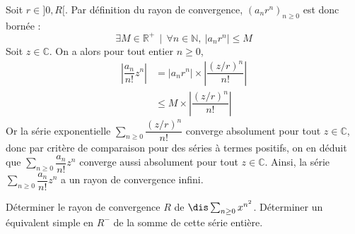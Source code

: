 \documentclass[a4paper,10pt]{report}
\newcommand{\Sum}[2]{\ensuremath{\textstyle{\sum\limits_{#1}^{#2}}}}
\begin{document}
\corr Soit $r\in ]0,R[$. Par définition du rayon de convergence, $(a_n r^n)_{n \geq 0}$ est donc bornée : 
\[
\exists M\in\mathbb{R}^+\,\mid\, \forall n\in\mathbb{N},\ \vert a_n r^n\vert \leq M
\]
Soit $z\in\mathbb{C}$. On a alors pour tout entier $n \geq 0$,
\begin{align*}
\left\vert \dfrac{a_n}{n!} z^n \right\vert & =\vert a_n r^n\vert \times \left\vert\dfrac{(z/r)^n}{n!}\right\vert \\
&  \leq M\times \left\vert\dfrac{(z/r)^n}{n!}\right\vert
\end{align*}
Or la série exponentielle $\Sum{n \geq 0}{} \dfrac{(z/r)^n}{n!}$ converge absolument pour tout $z\in\mathbb{C}$, donc par critère de comparaison pour des séries à termes positifs, on en déduit que $\Sum{n \geq 0}{} \dfrac{a_n}{n!} z^n$ converge aussi absolument pour tout $z\in\mathbb{C}$. Ainsi, la série $\Sum{n \geq 0}{} \dfrac{a_n}{n!} z^n$ a un rayon de convergence infini.

\begin{Exa}[\ding{80}] Déterminer le rayon de convergence $R$ de $\dis \sum_{n \geq 0} x^{n^2}$. Déterminer un équivalent simple en $R^{-}$ de la somme de cette série entière.
\end{Exa}
\end{document}
